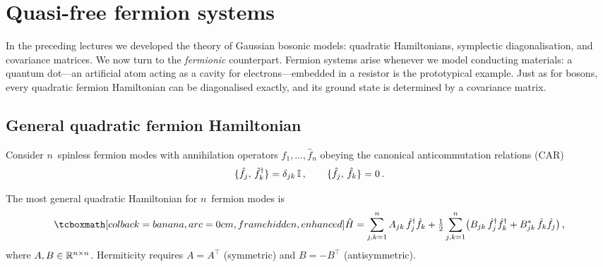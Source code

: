 

\section{Quasi-free fermion systems}\label{sec:fermion-systems}

In the preceding lectures we developed the theory of Gaussian bosonic
models: quadratic Hamiltonians, symplectic diagonalisation, and
covariance matrices.  We now turn to the \emph{fermionic} counterpart.
Fermion systems arise whenever we model conducting materials: a
quantum dot---an artificial atom acting as a cavity for
electrons---embedded in a resistor is the prototypical example.  Just
as for bosons, every quadratic fermion Hamiltonian can be diagonalised
exactly, and its ground state is determined by a covariance matrix.

\subsection{General quadratic fermion Hamiltonian}%
\label{sec:quadratic-fermion}

Consider $n$~spinless fermion modes with annihilation operators
$\hat{f}_1, \ldots, \hat{f}_n$ obeying the canonical
anticommutation relations (CAR)
\begin{equation}\label{eq:car}
  \{\hat{f}_j,\, \hat{f}_k^\dagger\} = \delta_{jk}\,\mathbb{I}\,,\qquad
  \{\hat{f}_j,\, \hat{f}_k\} = 0\,.
\end{equation}

\begin{definition}%
\label{def:quasi-free-fermion}
  The most general quadratic Hamiltonian for $n$~fermion modes is
  \begin{equation}\label{eq:fermion-H}
    \eqbox{\hat{H}
    = \sum_{j,k=1}^{n} A_{jk}\,\hat{f}_j^\adj \hat{f}_k
    + \tfrac{1}{2}\sum_{j,k=1}^{n}
      \bigl(B_{jk}\,\hat{f}_j^\adj \hat{f}_k^\adj
      + B_{jk}^*\,\hat{f}_k \hat{f}_j\bigr)}\,,
  \end{equation}
  where $A, B \in \mathbb{R}^{n \times n}$.  Hermiticity requires
  $A = A^\top$ (symmetric) and $B = -B^\top$ (antisymmetric).
\end{definition}

